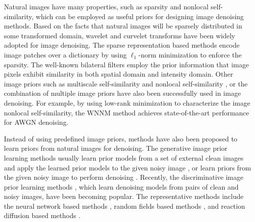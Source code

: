 Natural images have many properties, such as sparsity and nonlocal self-similarity, which can be employed as useful priors for designing image denoising methods. Based on the facts that natural images will be sparsely distributed in some transformed domain, wavelet \cite{bayesshrink} and curvelet \cite{curvelet} transforms have been widely adopted for image denoising. The sparse representation based methods \cite{ksvd,lssc,ncsr,bm3d,cbm3d,
zhou2012nonparametric} encode image patches over a dictionary by using $\ell_{1}$-norm minimization to enforce the sparsity. The well-known bilateral filters \cite{Tomasi1998} employ the prior information that image pixels exhibit similarity in both spatial domain and intensity domain. Other image priors such as multiscale self-similarity \cite{blsgsm} and nonlocal self-similarity \cite{nlm,nlbayes}, or the combination of multiple image priors \cite{wnnm,pgpd} have also been successfully used in image denoising. For example, by using low-rank minimization to characterize the image nonlocal self-similarity, the WNNM \cite{wnnm} method achieves state-of-the-art performance for AWGN denoising. 

Instead of using predefined image priors, methods have also been proposed to learn priors from natural images for denoising. The generative image prior learning methods usually learn prior models from a set of external clean images and apply the learned prior models to the given noisy image \cite{foe,epll,pgpd}, or learn priors from the given noisy image to perform denoising \cite{ksvd}. Recently, the discriminative image prior learning methods \cite{mlp,xie2012image,dncnn,
chen2015learning,
barbu2009training,csf}, which learn denoising models from pairs of clean and noisy images, have been becoming popular. The representative methods include the neural network based methods \cite{mlp,xie2012image,dncnn}, random fields based methods \cite{barbu2009training,csf}, and reaction diffusion based methods \cite{chen2015learning}.
 
